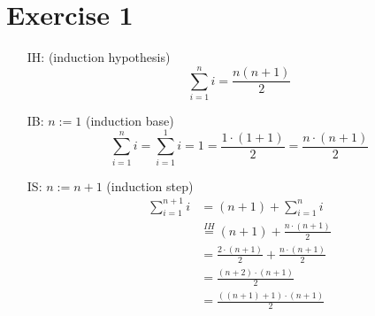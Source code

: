 \documentclass{article}
\begin{document}
\section*{Exercise 1}
\begin{itemize}
\item[IH:] (induction hypothesis)
  \begin{displaymath}
    \sum_{i=1}^{n}i = \frac{n(n+1)}{2}
  \end{displaymath}
\item[IB:] $n := 1$ (induction base)
  \begin{displaymath}
    \sum_{i=1}^{n} i = \sum_{i=1}^{1} i = 1
    = \frac{1 \cdot (1 + 1)}{2} = \frac{n \cdot (n+1)}{2}
  \end{displaymath}
\item[IS:] $n := n + 1$ (induction step)
  \begin{align*}
    \sum_{i=1}^{n+1} i &= (n + 1) + \sum_{i=1}^{n} i\\
    {} &\stackrel{IH}{=} (n + 1) + \frac{n \cdot (n + 1)}{2}\\
    {} &= \frac{2 \cdot (n + 1)}{2} + \frac{n \cdot (n + 1)}{2}\\
    {} &= \frac{(n + 2) \cdot (n + 1)}{2}\\
    {} &= \frac{((n + 1) + 1) \cdot (n + 1)}{2}
  \end{align*}
\end{itemize}
\pagebreak
\end{document}
